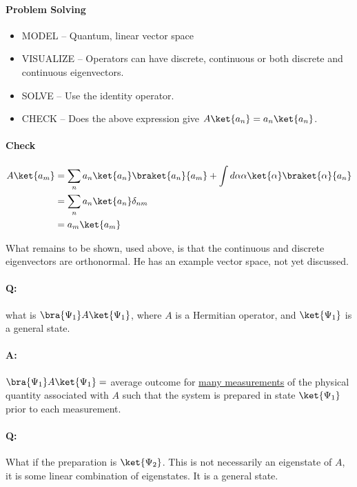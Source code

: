 \paragraph{Problem Solving}

\begin{itemize}
\item MODEL -- Quantum, linear vector space
\item VISUALIZE -- Operators can have discrete, continuous or both discrete and continuous eigenvectors.
\item SOLVE -- Use the identity operator.
\item CHECK -- Does the above expression give $A \ket{a_n} = a_n \ket{a_n}$.
\end{itemize}

\paragraph{Check}

\begin{align*}
A \ket{a_m}
&= \sum_n a_n \ket{a_n} \braket{a_n}{a_m} + \int d\alpha \alpha \ket{\alpha} \braket{\alpha}{a_n} \\
&= \sum_n a_n \ket{a_n} \delta_{nm} \\
&= a_m \ket{a_m}
\end{align*}

What remains to be shown, used above, is that the continuous and discrete eigenvectors are orthonormal.  He has an example vector space, not yet discussed.

\paragraph{Q:} what is $\bra{\Psi_1} A \ket{\Psi_1}$, where $A$ is a Hermitian operator, and $\ket{\Psi_1}$ is a general state.

\paragraph{A:} $\bra{\Psi_1} A \ket{\Psi_1} =$ average outcome for \underline{many measurements} of the physical quantity associated with $A$ such that the system is prepared in state $\ket{\Psi_1}$ prior to each measurement.

\paragraph{Q:}  What if the preparation is $\ket{\Psi_2}$.  This is not necessarily an eigenstate of $A$, it is some linear combination of eigenstates.  It is a general state.
